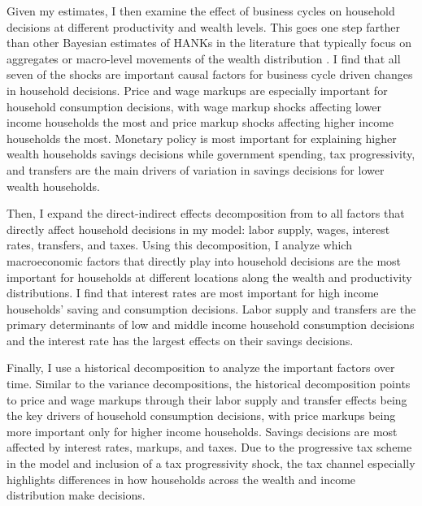 Given my estimates, I then examine the effect of business cycles on household decisions at different productivity and wealth levels. This goes one step farther than other Bayesian estimates of HANKs in the literature that typically focus on aggregates \autocites{auclert2020micro}{acharya2023estimating} or macro-level movements of the wealth distribution \autocites{bayer2024shocks}. I find that all seven of the shocks are important causal factors for business cycle driven changes in household decisions. Price and wage markups are especially important for household consumption decisions, with wage markup shocks affecting lower income households the most and price markup shocks affecting higher income households the most. Monetary policy is most important for explaining higher wealth households savings decisions while government spending, tax progressivity, and transfers are the main drivers of variation in savings decisions for lower wealth households. 

Then, I expand the direct-indirect effects decomposition from \textcite{kaplan2018monetary} to all factors that directly affect household decisions in my model: labor supply, wages, interest rates, transfers, and taxes. Using this decomposition, I analyze which macroeconomic factors that directly play into household decisions are the most important for households at different locations along the wealth and productivity distributions. I find that interest rates are most important for high income households' saving and consumption decisions. Labor supply and transfers are the primary determinants of low and middle income household consumption decisions and the interest rate has the largest effects on their savings decisions.

Finally, I use a historical decomposition to analyze the important factors over time. Similar to the variance decompositions, the historical decomposition points to price and wage markups through their labor supply and transfer effects being the key drivers of household consumption decisions, with price markups being more important only for higher income households. Savings decisions are most affected by interest rates, markups, and taxes. Due to the progressive tax scheme in the model and inclusion of a tax progressivity shock, the tax channel especially highlights differences in how households across the wealth and income distribution make decisions.
